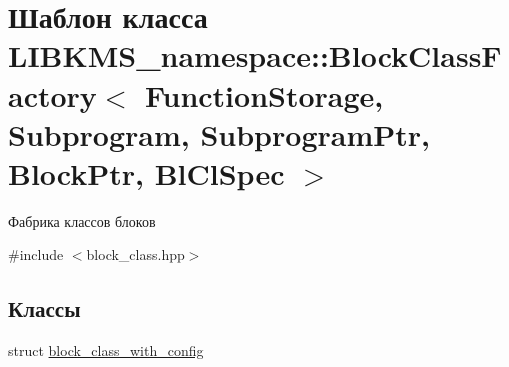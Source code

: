 \hypertarget{classLIBKMS__namespace_1_1BlockClassFactory}{\section{Шаблон класса L\-I\-B\-K\-M\-S\-\_\-namespace\-:\-:Block\-Class\-Factory$<$ Function\-Storage, Subprogram, Subprogram\-Ptr, Block\-Ptr, Bl\-Cl\-Spec $>$}
\label{classLIBKMS__namespace_1_1BlockClassFactory}
}


Фабрика классов блоков  




{\ttfamily \#include $<$block\-\_\-class.\-hpp$>$}

\subsection*{Классы}
\begin{DoxyCompactItemize}
\item 
struct \hyperlink{structLIBKMS__namespace_1_1BlockClassFactory_1_1block__class__with__config}{block\-\_\-class\-\_\-with\-\_\-config}
\end{DoxyCompactItemize}
